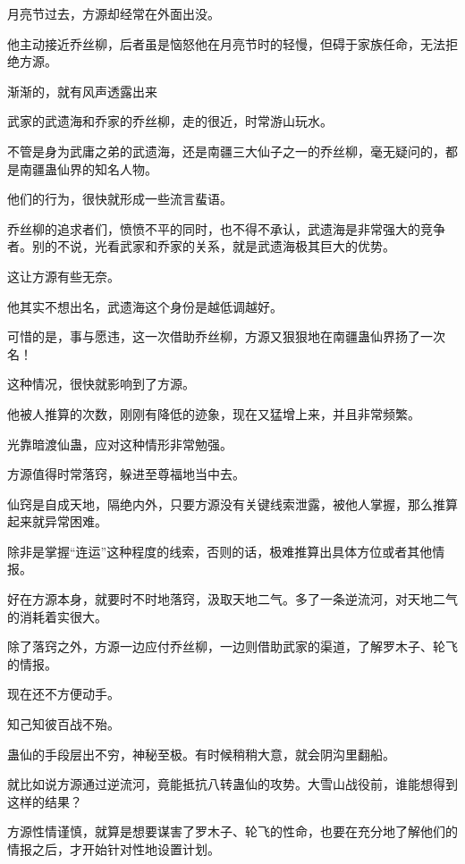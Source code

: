 
\begin{this_body}



月亮节过去，方源却经常在外面出没。

他主动接近乔丝柳，后者虽是恼怒他在月亮节时的轻慢，但碍于家族任命，无法拒绝方源。

渐渐的，就有风声透露出来

武家的武遗海和乔家的乔丝柳，走的很近，时常游山玩水。

不管是身为武庸之弟的武遗海，还是南疆三大仙子之一的乔丝柳，毫无疑问的，都是南疆蛊仙界的知名人物。

他们的行为，很快就形成一些流言蜚语。

乔丝柳的追求者们，愤愤不平的同时，也不得不承认，武遗海是非常强大的竞争者。别的不说，光看武家和乔家的关系，就是武遗海极其巨大的优势。

这让方源有些无奈。

他其实不想出名，武遗海这个身份是越低调越好。

可惜的是，事与愿违，这一次借助乔丝柳，方源又狠狠地在南疆蛊仙界扬了一次名！

这种情况，很快就影响到了方源。

他被人推算的次数，刚刚有降低的迹象，现在又猛增上来，并且非常频繁。

光靠暗渡仙蛊，应对这种情形非常勉强。

方源值得时常落窍，躲进至尊福地当中去。

仙窍是自成天地，隔绝内外，只要方源没有关键线索泄露，被他人掌握，那么推算起来就异常困难。

除非是掌握“连运”这种程度的线索，否则的话，极难推算出具体方位或者其他情报。

好在方源本身，就要时不时地落窍，汲取天地二气。多了一条逆流河，对天地二气的消耗着实很大。

除了落窍之外，方源一边应付乔丝柳，一边则借助武家的渠道，了解罗木子、轮飞的情报。

现在还不方便动手。

知己知彼百战不殆。

蛊仙的手段层出不穷，神秘至极。有时候稍稍大意，就会阴沟里翻船。

就比如说方源通过逆流河，竟能抵抗八转蛊仙的攻势。大雪山战役前，谁能想得到这样的结果？

方源性情谨慎，就算是想要谋害了罗木子、轮飞的性命，也要在充分地了解他们的情报之后，才开始针对性地设置计划。


\end{this_body}
